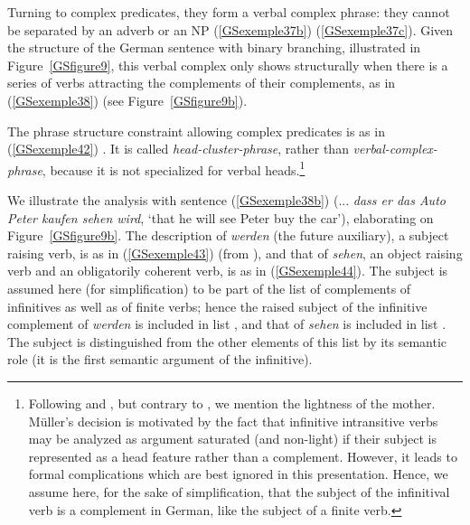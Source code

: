 \documentclass[output=paper
                ,modfonts
                ,nonflat
	        ,collection
	        ,collectionchapter
	        ,collectiontoclongg
 	        ,biblatex
                ,babelshorthands
                ,newtxmath
                ,draftmode
                ,colorlinks, citecolor=brown
]{./langsci/langscibook}
\begin{document}
{%

Turning to complex predicates, they form a verbal complex phrase: they cannot be separated by an adverb or an NP (\ref{GSexemple37b}) (\ref{GSexemple37c}). Given the structure of the German sentence with binary branching, illustrated in Figure~\ref{GSfigure9}, this verbal complex only shows structurally when there is a series of verbs attracting the complements of their complements, as in (\ref{GSexemple38}) (see Figure~\ref{GSfigure9b}).

The phrase structure constraint allowing complex predicates is as in (\ref{GSexemple42})
\citep{MuellerCopula, muller2018clause}. It is called \emph{head-cluster-phrase}, rather than \emph{verbal-complex-phrase}, because it is not specialized for verbal heads.\footnote{Following \cite{HN94a} and \cite{dKM2001a}, but contrary to \cite{muller2018clause}, we mention the lightness of the mother. Müller’s decision is motivated by the fact that infinitive intransitive verbs may be analyzed as argument saturated (and non-light) if their subject is represented as a head feature rather than a complement. However, it leads to formal complications which are best ignored in this presentation. Hence, we assume here, for the sake of simplification, that the subject of the infinitival verb is a complement in German, like the subject of a finite verb.  }  

\begin{exe}
\end{exe}

We illustrate the analysis with sentence (\ref{GSexemple38b}) (... \emph{dass er das Auto Peter kaufen sehen wird}, `that he will see Peter buy the car’), elaborating on Figure~\ref{GSfigure9b}. The description of \emph{werden} (the future auxiliary), a subject raising verb, is as in (\ref{GSexemple43}) (from \citealt{muller2018clause}), and that of \emph{sehen}, an object raising verb and an obligatorily coherent verb, is as in (\ref{GSexemple44}). The subject is assumed here (for simplification) to be part of the list of complements of infinitives as well as of finite verbs; hence the raised subject of the infinitive complement of \emph{werden} is included in list , and that of \emph{sehen} is included in list . The subject is distinguished from the other elements of this list by its semantic role (it is the first semantic argument of the infinitive).     

}
\end{document}
